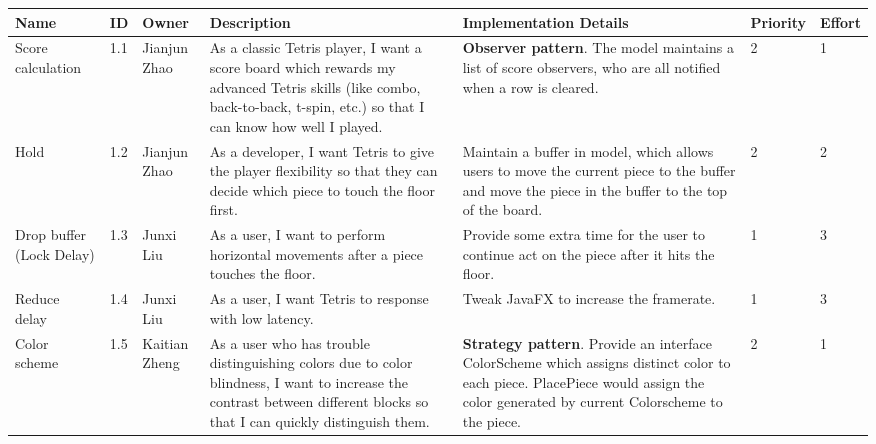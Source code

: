 \documentclass{article}
\begin{document}
\begin{xltabular}{\textwidth}{|p{2cm}|p{0.5cm}|p{1.5cm}|p{3cm}|p{3.5cm}|p{1.75cm}|p{1.25cm}|}
\hline
\textbf{Name}&\textbf{ID} &\textbf{Owner}&\textbf{Description}&\textbf{Implementation Details}&\textbf{Priority}&\textbf{Effort} \\
\hline
Score calculation
& 1.1
& Jianjun Zhao
& As a classic Tetris player, I want a score board which rewards my advanced Tetris skills (like combo, back-to-back, t-spin, etc.) so that I can know how well I played. 
& \textbf{Observer pattern}. The model maintains a list of score observers, who are all notified when a row is cleared. 
& 2 & 1\\
\hline
Hold
& 1.2
& Jianjun Zhao
& As a developer, I want Tetris to give the player flexibility so that they can decide which piece to touch the floor first. 
& Maintain a buffer in model, which allows users to move the current piece to the buffer and move the piece in the buffer to the top of the board. 
& 2 & 2 \\
\hline
Drop buffer (Lock Delay) 
& 1.3
& Junxi Liu
& As a user, I want to perform horizontal movements after a piece touches the floor. 
& Provide some extra time for the user to continue act on the piece after it hits the floor.
& 1 & 3 \\

\hline
Reduce delay 
& 1.4
& Junxi Liu
& As a user, I want Tetris to response with low latency.  
& Tweak JavaFX to increase the framerate.
& 1 & 3 \\

\hline
Color scheme 
& 1.5
& Kaitian Zheng
& As a user who has trouble distinguishing colors due to color blindness, I want to increase the contrast between different blocks so that I can quickly distinguish them. 
& \textbf{Strategy pattern}. Provide an interface ColorScheme which assigns distinct color to each piece. PlacePiece would assign the color generated by current Colorscheme to the piece. 
& 2 & 1 \\


\end{xltabular}
\end{document}
